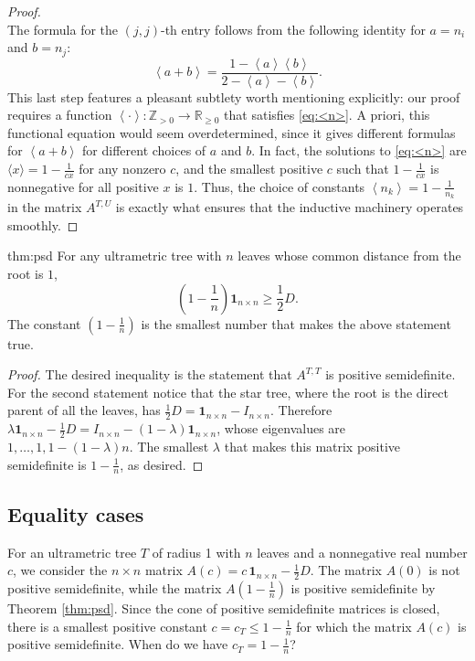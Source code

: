 \documentclass{amsart}
\theoremstyle{definition}
\theoremstyle{remark}
\newcommand{\angl}[1]{\left<#1\right>}              %
\newcommand{\Z}{\mathbb{Z}}
\newcommand{\R}{\mathbb{R}}
\newcommand{\1}{\mathbf{1}}
\numberwithin{equation}{section}
\begin{document}
\begin{proof}
\[	\]
The formula for the $(j,j)$-th entry follows from the following identity for $a=n_i$ and $b=n_j$:
	\begin{equation}\label{eq:<n>}
		\angl{a+b}= \frac{1-\angl{a}\angl{b}}{2-\angl{a}-\angl{b}}. \tag{$*$}
	\end{equation}
	This last step features a pleasant subtlety worth mentioning explicitly: our proof requires a function $\angl{ \cdot } \colon \Z_{>0} \rightarrow \R_{\geq 0}$ that satisfies \eqref{eq:<n>}. A priori, this functional equation would seem overdetermined, since it gives different formulas for $\angl{a+b}$ for different choices of $a$ and $b$. In fact, the solutions to \eqref{eq:<n>} are $\langle x \rangle = 1-\frac{1}{cx}$ for any nonzero $c$, and the smallest positive $c$ such that $1-\frac{1}{cx}$ is nonnegative for all positive $x$ is $1$.
	Thus, the choice of constants $\angl{n_k} = 1 - \frac1{n_k}$ in the matrix $A^{T,U}$
     is exactly what ensures that the inductive machinery operates smoothly.
\end{proof}


\begin{reptheorem}{thm:psd} 
For any ultrametric tree with $n$ leaves whose common distance from the root is $1$, 
\[
\left(1 - \frac{1}{n} \right)  \1_{n\times n}  \ge \frac{1}{2}D.
\]
The constant $(1 - \frac{1}{n})$ is the smallest number that makes the above statement true.
\end{reptheorem}


\begin{proof}
The desired inequality is the statement that $A^{T,T}$ is positive semidefinite. For the second statement notice that the star tree, where the root is the direct parent of all the leaves, has $\frac12D=\1_{n\times n} - I_{n \times n}$. Therefore $\lambda \1_{n \times n} - \frac12 D = I_{n \times n} - (1-\lambda) \1_{n \times n}$, whose eigenvalues are $1, \ldots, 1, 1-(1-\lambda)n$. The smallest $\lambda$ that makes this matrix positive semidefinite is $1 - \frac1n$, as desired.
\end{proof}

\subsection{Equality cases} \label{ssec:equality_cases}

For an ultrametric tree $T$ of radius 1 with $n$ leaves and a nonnegative real
number $c$, we consider the $n\times n$ matrix 
$A(c) = c \, \1_{n\times n} - \frac{1}{2}D.$
The matrix $A(0)$ is not positive semidefinite, while the matrix $A({1-\frac{1}{n}})$ is positive semidefinite by Theorem \ref{thm:psd}.  Since the cone of positive semidefinite matrices is closed, there is a smallest positive constant $c=c_T\leq 1-\frac{1}{n}$ for which the matrix $A(c)$ is positive semidefinite.
When do we have $c_T =1-\frac{1}{n}$?
\end{document}
